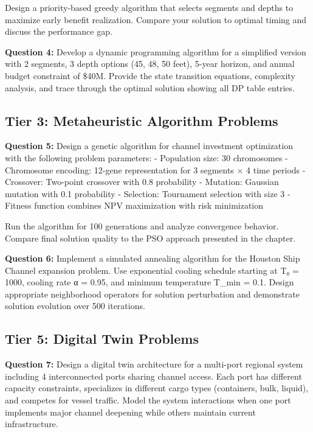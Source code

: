 \documentclass{article}
\begin{document}
Design a priority-based greedy algorithm that selects segments and depths to maximize early benefit realization. Compare your solution to optimal timing and discuss the performance gap.

\textbf{Question 4:} Develop a dynamic programming algorithm for a simplified version with 2 segments, 3 depth options (45, 48, 50 feet), 5-year horizon, and annual budget constraint of \$40M. Provide the state transition equations, complexity analysis, and trace through the optimal solution showing all DP table entries.

\subsection{Tier 3: Metaheuristic Algorithm Problems}

\textbf{Question 5:} Design a genetic algorithm for channel investment optimization with the following problem parameters:
- Population size: 30 chromosomes
- Chromosome encoding: 12-gene representation for 3 segments × 4 time periods
- Crossover: Two-point crossover with 0.8 probability  
- Mutation: Gaussian mutation with 0.1 probability
- Selection: Tournament selection with size 3
- Fitness function combines NPV maximization with risk minimization

Run the algorithm for 100 generations and analyze convergence behavior. Compare final solution quality to the PSO approach presented in the chapter.

\textbf{Question 6:} Implement a simulated annealing algorithm for the Houston Ship Channel expansion problem. Use exponential cooling schedule starting at T₀ = 1000, cooling rate α = 0.95, and minimum temperature T_min = 0.1. Design appropriate neighborhood operators for solution perturbation and demonstrate solution evolution over 500 iterations.

\subsection{Tier 5: Digital Twin Problems}

\textbf{Question 7:} Design a digital twin architecture for a multi-port regional system including 4 interconnected ports sharing channel access. Each port has different capacity constraints, specializes in different cargo types (containers, bulk, liquid), and competes for vessel traffic. Model the system interactions when one port implements major channel deepening while others maintain current infrastructure.
\end{document}

